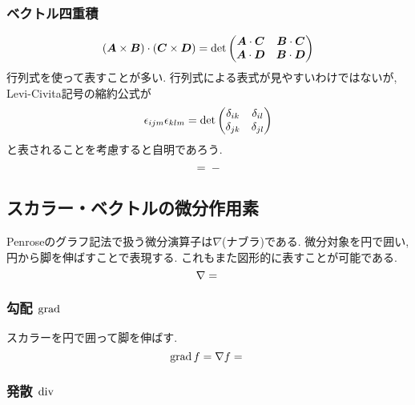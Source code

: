 \documentclass[dvipdfmx]{jsarticle}
\begin{document}
\subsubsection{ベクトル四重積}

\begin{equation*}
    (\bm{A}\times\bm{B})\cdot(\bm{C}\times\bm{D})
    =
    \det\mqty(
        \bm{A}\cdot\bm{C}
        &
        \bm{B}\cdot\bm{C}
        \\
        \bm{A}\cdot\bm{D}
        &
        \bm{B}\cdot\bm{D}
    )
\end{equation*}
行列式を使って表すことが多い.
行列式による表式が見やすいわけではないが, Levi-Civita記号の縮約公式が
\begin{align*}
    \epsilon_{ijm}\epsilon_{klm}
    =
    \det\mqty(
        \delta_{ik} & \delta_{il}
        \\
        \delta_{jk} & \delta_{jl}
    )
\end{align*}
と表されることを考慮すると自明であろう.
\begin{equation*}
    \vcenter{\hbox{}}
    =
    \vcenter{\hbox{}}
    -
    \vcenter{\hbox{}}
\end{equation*}



\subsection{スカラー・ベクトルの微分作用素}

Penroseのグラフ記法で扱う微分演算子は$\nabla$(ナブラ)である.
微分対象を円で囲い, 円から脚を伸ばすことで表現する.
これもまた図形的に表すことが可能である.
\begin{equation*}
    \nabla
    =
    \vcenter{\hbox{}}
\end{equation*}


\subsubsection{勾配 $\operatorname{\mathrm{grad}}$}

スカラーを円で囲って脚を伸ばす.
\begin{equation*}
    \gradop{f}=\nabla f
    =
    \vcenter{\hbox{}}
\end{equation*}


\subsubsection{発散 $\operatorname{\mathrm{div}}$}
\end{document}
